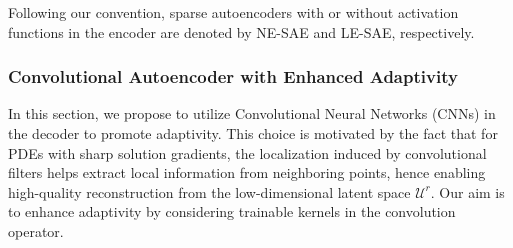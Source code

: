 Following our convention, sparse autoencoders with or without activation functions in the encoder are denoted by NE-SAE and LE-SAE, respectively. 

\subsubsection{Convolutional Autoencoder with Enhanced Adaptivity}\label{sec: cnnae}

In this section, we propose to utilize Convolutional Neural Networks (CNNs) in the decoder to promote adaptivity. This choice is motivated by the fact that for PDEs with sharp solution gradients, the localization induced by convolutional filters helps extract local information from neighboring points, hence enabling high-quality reconstruction from the low-dimensional latent space $\mathcal{U}^r$. Our aim is to enhance adaptivity by considering trainable kernels in the convolution operator.


